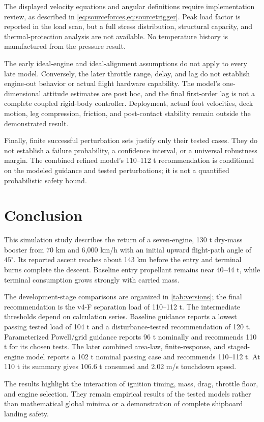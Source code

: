\documentclass[11pt,a4paper]{article}
\begin{document}
The displayed velocity equations and angular definitions require implementation review, as described in \cref{eq:sourceforces,eq:sourcetrigger}. Peak load factor is reported in the load scan, but a full stress distribution, structural capacity, and thermal-protection analysis are not available. No temperature history is manufactured from the pressure result.

The early ideal-engine and ideal-alignment assumptions do not apply to every late model. Conversely, the later throttle range, delay, and lag do not establish engine-out behavior or actual flight hardware capability. The model's one-dimensional attitude estimates are post hoc, and the final first-order lag is not a complete coupled rigid-body controller. Deployment, actual foot velocities, deck motion, leg compression, friction, and post-contact stability remain outside the demonstrated result.

Finally, finite successful perturbation sets justify only their tested cases. They do not establish a failure probability, a confidence interval, or a universal robustness margin. The combined refined model's 110--112 t recommendation is conditional on the modeled guidance and tested perturbations; it is not a quantified probabilistic safety bound.

\section{Conclusion}
This simulation study describes the return of a seven-engine, 130 t dry-mass booster from 70 km and 6,000 km/h with an initial upward flight-path angle of $45^\circ$. Its reported ascent reaches about 143 km before the entry and terminal burns complete the descent. Baseline entry propellant remains near 40--44 t, while terminal consumption grows strongly with carried mass.

The development-stage comparisons are organized in \cref{tab:versions}; the final recommendation is the v4-F separation load of 110--112 t. The intermediate thresholds depend on calculation series. Baseline guidance reports a lowest passing tested load of 104 t and a disturbance-tested recommendation of 120 t. Parameterized Powell/grid guidance reports 96 t nominally and recommends 110 t for its chosen tests. The later combined area-law, finite-response, and staged-engine model reports a 102 t nominal passing case and recommends 110--112 t. At 110 t its summary gives 106.6 t consumed and 2.02 m/s touchdown speed.

The results highlight the interaction of ignition timing, mass, drag, throttle floor, and engine selection. They remain empirical results of the tested models rather than mathematical global minima or a demonstration of complete shipboard landing safety.
\end{document}
